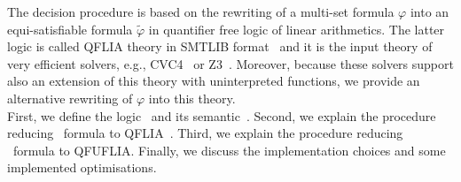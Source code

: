 The decision procedure is based on the rewriting of a multi-set formula $\varphi$ into
an equi-satisfiable formula $\tilde{\varphi}$ in quantifier free logic of linear arithmetics.
The latter logic is called QFLIA theory in SMTLIB format~\cite{SMTLIB10} and it is the input theory of very efficient solvers, e.g.,
CVC4~\cite{barrett2011cvc4} or Z3~\cite{de2008z3}.
Moreover, because these solvers support also an extension of this theory with uninterpreted functions,
we provide an alternative rewriting of $\varphi$ into this theory.
\\
\indent
First, we define the logic \QFBILIA\ and its semantic~\cite{piskac2010decision}.
Second, we explain the procedure reducing \QFBILIA\ formula to QFLIA~\cite{zarba2002combining}.
Third, we explain the procedure reducing \QFBILIA\ formula to QFUFLIA.
Finally, we discuss the implementation choices and some implemented optimisations.


